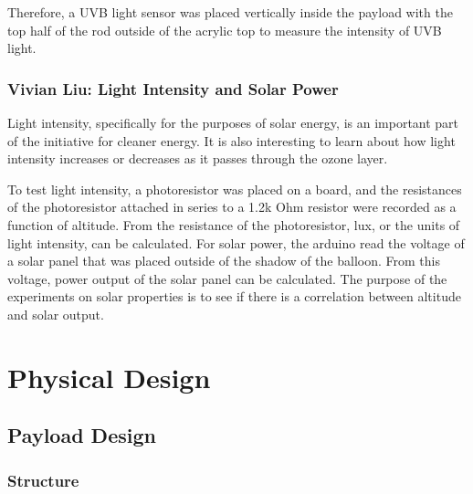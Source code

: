 \documentclass[12pt,]{article}
\begin{document}
Therefore, a UVB light sensor was placed vertically inside the payload
with the top half of the rod outside of the acrylic top to measure the
intensity of UVB light.

\subsubsection{Vivian Liu: Light Intensity and Solar
Power}\label{vivian-liu-light-intensity-and-solar-power}

Light intensity, specifically for the purposes of solar energy, is an
important part of the initiative for cleaner energy. It is also
interesting to learn about how light intensity increases or decreases as
it passes through the ozone layer.

To test light intensity, a photoresistor was placed on a board, and the
resistances of the photoresistor attached in series to a 1.2k Ohm
resistor were recorded as a function of altitude. From the resistance of
the photoresistor, lux, or the units of light intensity, can be
calculated. For solar power, the arduino read the voltage of a solar
panel that was placed outside of the shadow of the balloon. From this
voltage, power output of the solar panel can be calculated. The purpose
of the experiments on solar properties is to see if there is a
correlation between altitude and solar output.

\section{Physical Design}\label{physical-design}

\subsection{Payload Design}\label{payload-design}

\subsubsection{Structure}\label{structure}
\end{document}
